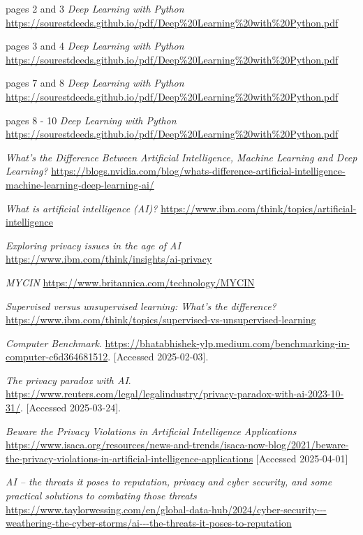 \documentclass[licencjacka,en]{pracamgr}
\begin{document}
\begin{thebibliography}{99}
    pages 2 and 3
    \textit{Deep Learning with Python}
    \url{https://sourestdeeds.github.io/pdf/Deep%20Learning%20with%20Python.pdf}

    pages 3 and 4
    \textit{Deep Learning with Python}
    \url{https://sourestdeeds.github.io/pdf/Deep%20Learning%20with%20Python.pdf}

    pages 7 and 8
    \textit{Deep Learning with Python}
    \url{https://sourestdeeds.github.io/pdf/Deep%20Learning%20with%20Python.pdf}

    pages 8 - 10
    \textit{Deep Learning with Python}
    \url{https://sourestdeeds.github.io/pdf/Deep%20Learning%20with%20Python.pdf}

    \textit{What’s the Difference Between Artificial Intelligence, Machine Learning and Deep Learning?}
    \url{https://blogs.nvidia.com/blog/whats-difference-artificial-intelligence-machine-learning-deep-learning-ai/}

    \textit{What is artificial intelligence (AI)?}
    \url{https://www.ibm.com/think/topics/artificial-intelligence}

    \textit{Exploring privacy issues in the age of AI}
    \url{https://www.ibm.com/think/insights/ai-privacy}

    \textit{MYCIN}
    \url{https://www.britannica.com/technology/MYCIN}

    \textit{Supervised versus unsupervised learning: What's the difference?}
    \url{https://www.ibm.com/think/topics/supervised-vs-unsupervised-learning}

    \textit{Computer Benchmark}.
    \url{https://bhatabhishek-ylp.medium.com/benchmarking-in-computer-c6d364681512}.
    [Accessed 2025-02-03].

    \textit{The privacy paradox with AI}.
    \url{https://www.reuters.com/legal/legalindustry/privacy-paradox-with-ai-2023-10-31/}.
    [Accessed 2025-03-24].

    \textit{Beware the Privacy Violations in Artificial Intelligence Applications}
    \url{https://www.isaca.org/resources/news-and-trends/isaca-now-blog/2021/beware-the-privacy-violations-in-artificial-intelligence-applications}
    [Accessed 2025-04-01]

    \textit{AI – the threats it poses to reputation, privacy and cyber security, and some practical solutions to combating those threats}
    \url{https://www.taylorwessing.com/en/global-data-hub/2024/cyber-security---weathering-the-cyber-storms/ai---the-threats-it-poses-to-reputation}


\end{thebibliography}
\end{document}
